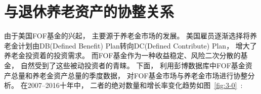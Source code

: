 
\section{与退休养老资产的协整关系}
由于美国FOF基金的兴起， 主要源于养老金市场的发展。 美国雇员逐渐选择将养老金计划由DB(Defined Benefit) Plan转向DC(Defined Contribute) Plan， 增大了养老金投资着的投资需求。 而FOF基金作为一种收益稳定、风险二次分散的基金， 自然受到了这些被动投资者的青睐。 下面， 利用彭博数据库中FOF基金资产总量和养老金资产总量的季度数据， 对FOF基金市场与养老金市场进行协整分析。 在2007--2016十年中， 二者的绝对数量和增长率变化趋势如图~\ref{fig:3-0}~:



